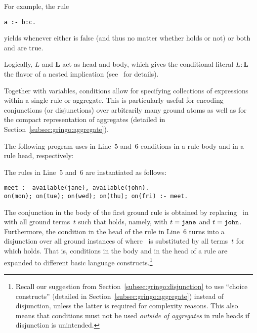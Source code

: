 For example, the rule
\begin{lstlisting}[numbers=none]
a :- b:c.
\end{lstlisting}
yields  whenever either  is false (and thus no matter whether  holds or not) or both  and  are true.

\begin{note}
Logically, $L$ and $\boldsymbol{L}$ act as head and body,
which gives the conditional literal $L:\boldsymbol{L}$ the flavor of a nested implication
(see~\cite{haliya14a} for details).
\eexample{}
\end{note}

Together with variables,
conditions allow for specifying collections of expressions within a single rule or aggregate.
This is particularly useful for encoding conjunctions (or disjunctions) over
arbitrarily many ground atoms as well as for the compact representation of aggregates
(detailed in Section~\ref{subsec:gringo:aggregate}).

\begin{example}\label{ex:cond}
The following program uses in Line~5 and~6 conditions in a rule body and in a rule head, respectively:
%

%
The rules in Line~5 and~6 are instantiated as follows:%
\begin{lstlisting}[numbers=none]
meet :- available(jane), available(john).
on(mon); on(tue); on(wed); on(thu); on(fri) :- meet.
\end{lstlisting}
%
The conjunction in the body of the first ground rule is obtained by replacing~ in
 with all ground terms~$t$ such that
 holds, namely, with $t=\texttt{jane}$ and $t=\texttt{john}$.
Furthermore, the condition in the head of the rule in Line~6 turns into
a disjunction over all ground instances of
 where~ is substituted by all terms~$t$
for which  holds.
That is, conditions in the body and in the head of a rule
are expanded to different basic language constructs.\footnote{%
Recall our suggestion from Section~\ref{subsec:gringo:disjunction}
to use ``choice constructs'' (detailed in Section~\ref{subsec:gringo:aggregate})
instead of disjunction, unless the latter is required for complexity reasons.
This also means that conditions must
not be used \emph{outside of aggregates} in rule heads
if disjunction is unintended.}
\eexample
\end{example}

